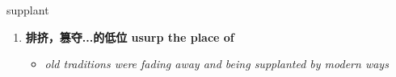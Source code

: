 
\begin{frame}
{\huge supplant}
\begin{center}
\begin{enumerate}\Large
  \item \textbf{排挤，篡夺...的低位 usurp the place of}
  \begin{itemize}
    \item \em{\Large{old traditions were fading away and being supplanted by modern ways}}
  \end{itemize}
\end{enumerate}
\end{center}
\end{frame}
